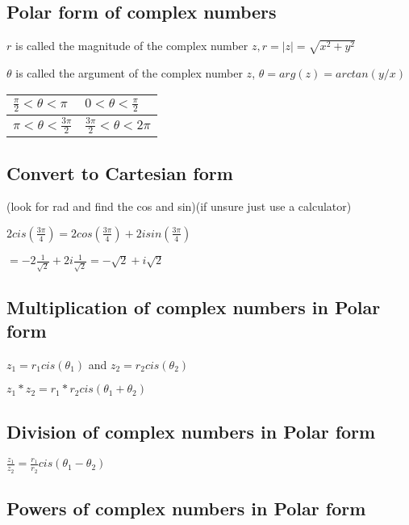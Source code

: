 \documentclass{extarticle}
\begin{document}
\subsection{Polar form of complex numbers}

$r$ is called the magnitude of the complex number $z, r=\left|z\right|=\sqrt{x^2+y^2}$

$\theta$ is called the argument of the complex number $z$, $\theta=arg\left(z\right)=arctan{\left(y/x\right)}$

\begin{tabu}{|X|X|}
    \hline
$\frac{\pi}{2}<\theta<\pi$ & $0<\theta<\frac{\pi}{2}$ \\ \hline
$\pi<\theta<\frac{3\pi}{2}$ & $\frac{3\pi}{2}<\theta<2\pi$ \\ \hline
    \end{tabu}







\subsection{Convert to Cartesian form}

(look for rad and find the cos and sin)(if unsure just use a calculator)

$2cis\left(\frac{3\pi}{4}\right)=2cos{\left(\frac{3\pi}{4}\right)}+2isin{\left(\frac{3\pi}{4}\right)}$

$=-2\frac{1}{\sqrt2}+2i\frac{1}{\sqrt2}=-\sqrt2+i\sqrt2$

\subsection{Multiplication of complex numbers in Polar form}

$z_1=r_1cis\left(\theta_1\right)$ and $z_2=r_2cis\left(\theta_2\right)$

$z_1\ast z_2=r_1\ast r_2cis\left(\theta_1+\theta_2\right)$

\subsection{Division of complex numbers in Polar form}

$\frac{z_1}{z_2}=\frac{r_1}{r_2}cis\left(\theta_1-\theta_2\right)$

\subsection{Powers of complex numbers in Polar form}
\end{document}
